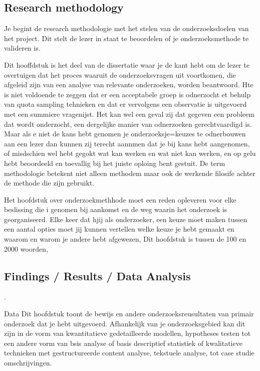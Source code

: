\subsection{Research methodology}






Je begint de research methodologie met het stelen van de onderzoeksdoelen van het project. Dit stelt de lezer in staat te beoordelen of je onderzoeksmethode te valideren is.

Dit hooffdstuk is het deel van de dissertatie waar je de kant hebt om de lezer te overtuigen dat het proces waaruit de onderzoeksvragen uit voortkomen, die afgeleid zijn van een analyse van relevante onderzoeken, worden beantwoord. Hte is niet voldoende te zeggen dat er een acceptabele groep is odnerzocht et behulp van quota sampling tehnieken en dat er vervolgens een observatie is uitgevoerd met een summiere vragenijst. Het kan wel een geval zij  dat gegeven een probleem dat wordt onderzocht, een dergelijke manier van odnerzoeken gerechtvaardigd is. Maar als e niet de kans hebt genomen je onderzoeksje=keuzes te odnerbouwen aan een lezer dan kunnen zij terecht aannmen dat je bij kans hebt aangenomen, of misdschien wel hebt gegokt wat kan werken en wat niet kan werken, en op gelu hebt beoordeeld en toevallig bij het juiste oploing bent gestuit.
De term methodologie  betekent niet alleen methodem maar ook de werkende filosife achter de methode die zijn gebruikt.


Het hoofdstuk over onderzoekmethhode moet een reden opleveren voor elke beslissing die i genomen bij aankomst en de weg waarin het onderzoek is georganiseerd. Elke keer dat hjij als onderzoeker, een keuze moet maken tussen een aantal opties moet  jij kunnen vertellen welke keuze je hebt gemaakt en waarom en warom je andere hebt afgewezen, Dit hoofdstuk is tussen de 100 en 2000 woorden,

\subsection{Findings / Results / Data Analysis}
.





Data
Dit hoofdstuk toont de bewijs en andere onderzoeksreusultaten van primair onderzoek dat je hebt uitgevoerd. Afhankelijk van je onderzoeksgebied kan dit zijn in de vorm van kwantitatieve gedetailleerde modellen,  hypotheses testen tot een andere vorm van bsis analyse of basis descriptief statistiek of kwalitatieve technieken  met gestructureerde content analyse, tekstuele analyse, tot case studie omschrijvingen.

